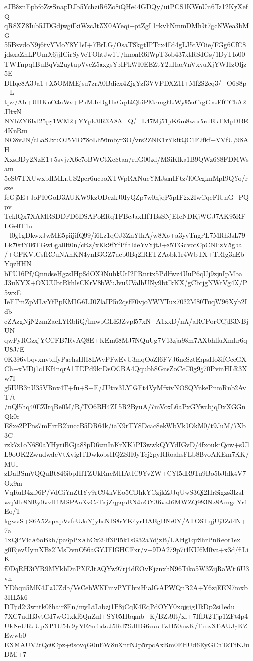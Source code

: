 eJB8znEpbfoZwSnapDJb5YchziR6Zo8iQHe44GDQy/utPCS1KWnUn6Tz12KyXefQ
qR8XZ8Iub5JDGdjwgiIkiWzcJtZX0AYeqi+ptZgL1rkvhNmmDMh9t7gcNWea3bMG
55BzvdoN9j6tvYMoY8Y1eI+7BrLG/OsaTSkgtIPTcx4Fd4gLJ5tVOie/FGg6CfC8
jdsxaZnLPUmX6jjIOirSyVeTOhtJw1T/hnonR6fWpT3ob437xtRSdGs/1DyTIo00
TWTnpq1BuBqVz2uytupVvcZ5axgsYpIPkWI0EEZtY2uHaeVnVxvuXjYWHzOljz5E
DHqe8A3Ja1+X5OMMEjsu7zrA0Bdiex4ZjgYzf3VVPDXZ1I+Mf2S2cq3/+O6S8p+L
tpv/Ah+UHKnO4aWv+PhMJcDgHaGqd4QkiPMemg6lsWy95aCrgGxsFfCChA2JItxN
NYbZY6Ixl25py1WM2+YYpk3lR3A8A+Q/+L47Mj51pK6m8wor5rdBkTMpDBE4KnRm
NO8vJN/cLaS2xuO25MO78oLh56mbyr3O/vrs2ZNK1rYkitQC1F2fkf+VVfU/98AH
XxsBDy2NzE1+5svjvX6e7oBWCtXcStaa/rdG00zd/MSiKlka1B9QWz6S8FDMWsam
5cS07TXUwxbHMLnUS2pcr6ucooXTWpRANucYMJsmIFtz/l0CegknMpI9QYo/rsze
feGj5E+JoPI0GoD3AUKW9kzODczkJ0IyQZp7w0hjqP5pIF2x2IwCqeFfUnG+PQpv
TekIQx7XAMRSDDFD6DSAPoERqTFBcJaxHfTBsSNjEIeNDKjWGJ7AK95RFLGe0T1n
+l0g1gDkwxJwME5piijifQ99/i6Lz1qOJ3ZnYlhA/w8Xo+a3yyTngPL7MRh3sL79
Lk70riY06TGwLga0It0n/cRz/xKk9fYfPfhIdeYvYjtJ+z5TGdvotCpCNPzV5gba
/+GFKVtCsfRCuNAhKN4ynB3GZ7dcb0Bq2iRETZAobk1r4WbTX+TRIg3nEbYqzHHN
bFU16Pf/QnndseHgzsIHpSdOX9NuhkUtI2FRnrtx5Pdlfwz4UuP6qUj9zjnIpMba
J3uNYX+OXUUbtRkhlsCKrV8bWuJvuUValhUNy9btIkKX/gCbrjgNWtVg4X/P5wxE
IeFTmZpMLvYfPpKMIG6LJ0ZlaIP5r2qsfF0vjoYWYTux7032M80TuqW96Xyb2Idb
cZAzgNjN2zmZacLYRbfiQ/lmwpGLE3Zvpl57xN+A1xxD/nA/aRCPorCCjB3NBjUN
qwPyRGzxjYCCFB7RvAQ8E+KEm68MJ7NQuUg7V13zja98m7AXbhlfuXmhr6qU8J/E
0K396vbqvxnvtdfyPaehsHH8LWvPFwEvU3mqOoZl6FVJ6neSztErpsHo3ifCceGX
Ch+xMDj1c1Kf4nqrA1TDPd9ktDsOCBA4Qqubh8GnsZoCcC0g9g70PvinHLR3Xw7I
g5IUB3nU35VBnx4T+fu+S+E/JUtre3LYlGFt4VyMfxivNOSQYnkePnmRnb2AvT/t
/nQl5hq40EZIrqBe0M/R/TO6RH4ZL5R2ByuA/7mVoxL6aPxGYwcbjqDxXGGnQk0c
E8xe2PPns7mHrrB2buccB5DR64k/iaK9rTY8Dcac8ekWbVk0OkM0/t9JuM/7Xb3C
rzk7z1oN6S0aYHyriBGja88pD6zmInKrXK7PI3wwkQYYdIGvD/4fxouktQcw+sUl
L9oOK2ZwudwdcVtXviglTDwkobsHQZSH0yTcj2pyRRoahsFLb8BvoAKEm7KK/MUI
zDaBSmVQQuBt846ibpHlTZUkRncMHAtIC9YvZW+CYl5dR9Tn9Bo5bJldk4V7Ox9m
VqRuB4zD6P/VdGiYnZtIYy9rC94kVEo5CDhkYCzjkZJJqUwS3Qi2HrSigzs3IzsI
wqMlr8NBy0vvH1MSPAaXzCcTajZqpqoBN4uOY36vzJ6MWZQ993Nz8AmgdYr1Eo/T
kgwvS+S6A5ZzpapVvfrUJoYjybsNIS8rYK4yrDABgBNr0Y/ATOSTqjUj3Zd4N+7a
1xQPVicA6oBkh/pa6pPxAhCx2i4f3PI5k1sG32aYdjzB/LAHg1qrShrPnReot1ex
g0EjevUymXBz2lMsDvnO56aGYJFlGHCFxr/v+9DA279p7i4KU6M0va+x3d/fiLiK
f0DqRH3tYR9MYkhDnPXFJtAQYw97rj4dEOvKjznxhN96Tiko5W3ZijRaWti6U3vn
YDbqu5MK4JlaUZdb/VsCebWNFmvPYFhpiHiaIGAPWQnB2A+Y6zjEEN7mxb3HL5k6
DTpd2i3wntk08hair8En/myLtLrbzj1B8jCqK4EqPdOYY0xqjgig1lkDp2si1edu
7XG7udH3vtGd7wG1xkf6QnZnl+SY05Hbqmb+K/BZs9lt/xI+7IfDt2Tjp1ZFt4p4
UkNeURdUpXP1U54r9yYE8n4ntoJ5Rd7SdHG6zuuTwH50msK/EmzXEAUJyKZEwwb0
EXMAUV2rQc0Cpz+6sovqG0uEW8uXnrNJp5rpcAxRm0EHUd6EyGCnTsTtKJuDMi+7
